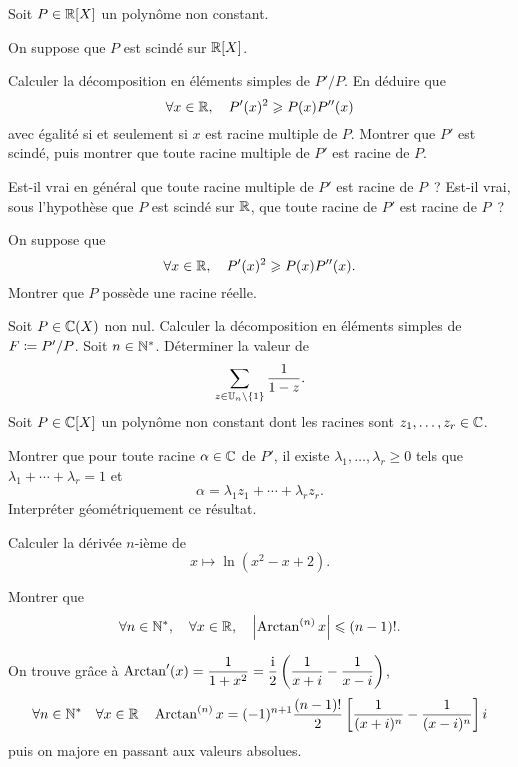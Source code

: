 \documentclass{magnolia}
\begin{document}
Soit $P\in\polyR$ un polynôme non constant.
\begin{questions}
\question On suppose que $P$ est scindé sur $\polyR$.
\begin{questions}
\question Calculer la décomposition en éléments simples de $P'/P$.
\question En déduire que
  \[\forall x\in\mathbb{R},\quad P'(x)^2\geqslant P(x)P''(x)\]
  avec égalité si et seulement si $x$ est racine multiple de $P$.
\question Montrer que $P'$ est scindé, puis montrer que toute
  racine multiple de $P'$ est racine de $P$.
\end{questions}
\question
\begin{questions}
\question Est-il vrai en général que toute racine multiple de $P'$ est racine de $P$~?
\question Est-il vrai, sous l'hypothèse que $P$ est scindé sur $\mathbb{R}$, que toute racine de $P'$ est racine de $P$~?
\end{questions}
\question On suppose que
  \[\forall x\in\mathbb{R},\quad P'(x)^2\geqslant P(x)P''(x).\]
  Montrer que $P$ possède une racine réelle.
\end{questions}


\begin{questions}
\question Soit $P\in\fracC$ non nul. Calculer la décomposition en éléments simples de $F\coloneqq P'/P$.
\question Soit $n\in{\mathbb{N}^*}$. Déterminer la valeur de
  \[\sum_{z\in\mathbb{U}_n\setminus\left\{1\right\}} \frac{1}{1-z}.\]
\question Soit $P\in\polyC$ un polynôme non constant dont les racines sont $z_1,\ldots,z_r\in\mathbb{C}$.
\begin{questions}
\question Montrer que pour toute racine $\alpha\in\mathbb{C}$ de $P'$, il existe $\lambda_1,\ldots,\lambda_r \geq 0$
  tels que $\lambda_1+\cdots+\lambda_r=1$ et \[\alpha=\lambda_1 z_1+\cdots+\lambda_r z_r.\]
\question Interpréter géométriquement ce résultat.
\end{questions}
\end{questions}

Calculer la dérivée $n$-ième de
\[x\mapsto\ln(x^2-x+2).\]

Montrer que
\[\forall n\in{\mathbb{N}^*} ,\quad \forall x\in\mathbb{R} ,\quad \left|\operatorname{Arctan}^{(n)} x\right|\leqslant(n-1)!.\]
\begin{sol}
On trouve grâce à $\operatorname{Arctan}'(x)=\dfrac{1}{1+x^2}=\dfrac{{\rm i}}{2}\left(\dfrac{1}{x+i}-\dfrac{1}{x-i}\right)$, 
\[\forall n\in{\mathbb{N}^*} \quad \forall x\in\mathbb{R} \quad \operatorname{Arctan}^{(n)} x=
  (-1)^{n+1}\frac{(n-1)!}{2}\left[\frac{1}{(x+i)^n}-\frac{1}{(x-i)^n}\right]i\]
  puis on majore en passant aux valeurs absolues.
\end{sol}
\end{document}
